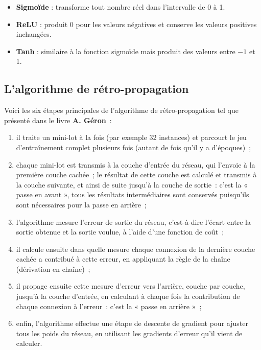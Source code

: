 \documentclass[a4paper,12pt,twoside]{report}
\theoremstyle{definition}
\theoremstyle{plain}
\theoremstyle{remark}
\begin{document}
\begin{itemize}
	\item \textbf{Sigmoïde} : transforme tout nombre réel dans l'intervalle de 0 à 1.
	\item \textbf{\ac{ReLU}} : produit 0 pour les valeurs négatives et conserve les valeurs positives inchangées.
	\item \textbf{Tanh} : similaire à la fonction sigmoïde mais produit des valeurs entre $-1$ et 1.
\end{itemize}

\subsection{L'algorithme de rétro-propagation}

Voici les six étapes principales de l'algorithme de rétro-propagation tel que présenté dans le livre \textbf{A. Géron}\cite{geron2023deeplearning}~:
\begin{enumerate}
	\item il traite un mini-lot à la fois (par exemple 32 instances) et parcourt le jeu d'entraînement complet plusieurs fois (autant de fois qu'il y a d'époques)~;
	\item chaque mini-lot est transmis à la couche d'entrée du réseau, qui l'envoie à la première couche cachée~; le résultat de cette couche est calculé et transmis à la couche suivante, et ainsi de suite jusqu'à la couche de sortie~: c'est la « passe en avant », tous les résultats intermédiaires sont conservés puisqu'ils sont nécessaires pour la passe en arrière~;
	\item l'algorithme mesure l'erreur de sortie du réseau, c'est-à-dire l'écart entre la sortie obtenue et la sortie voulue, à l'aide d'une fonction de coût~;
	\item il calcule ensuite dans quelle mesure chaque connexion de la dernière couche cachée a contribué à cette erreur, en appliquant la règle de la chaîne (dérivation en chaîne)~;
	\item il propage ensuite cette mesure d'erreur vers l'arrière, couche par couche, jusqu'à la couche d'entrée, en calculant à chaque fois la contribution de chaque connexion à l'erreur~: c'est la « passe en arrière »~;
	\item enfin, l'algorithme effectue une étape de descente de gradient pour ajuster tous les poids du réseau, en utilisant les gradients d'erreur qu'il vient de calculer.
\end{enumerate}
\end{document}
